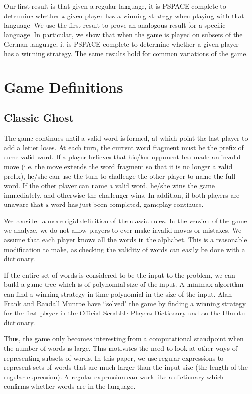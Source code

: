 \documentclass[runningheads,a4paper]{llncs}
\begin{document}
	Our first result is that given a regular language, it is PSPACE-complete to determine whether a given player has a winning strategy when playing with that language. We use the first result to prove an analogous result for a specific language. In particular, we show that when the game is played on subsets of the German language, it is PSPACE-complete to determine whether a given player has a winning strategy. The same results hold for common variations of the game.

\section{Game Definitions}
\label{Game Definitions}

\subsection{Classic Ghost}

The game continues until a valid word is formed, at which point the last player to add a letter loses. At each turn, the current word fragment must be the prefix of some valid word. If a player believes that his/her opponent has made an invalid move (i.e. the move extends the word fragment so that it is no longer a valid prefix), he/she can use the turn to challenge the other player to name the full word. If the other player can name a valid word, he/she wins the game immediately, and otherwise the challenger wins. In addition, if both players are unaware that a word has just been completed, gameplay continues.

	We consider a more rigid definition of the classic rules. In the version of the game we analyze, we do not allow players to ever make invalid moves or mistakes. We assume that each player knows all the words in the alphabet. This is a reasonable modification to make, as checking the validity of words can easily be done with a dictionary.

	If the entire set of words is considered to be the input to the problem, we can build a game tree which is of polynomial size of the input. A minimax algorithm can find a winning strategy in time polynomial in the size of the input. Alan Frank and Randall Munroe have ``solved" the game by finding a winning strategy for the first player in the Official Scrabble Players Dictionary and on the Ubuntu dictionary. 

	Thus, the game only becomes interesting from a computational standpoint when the number of words is large. This motivates the need to look at other ways of representing subsets of words. In this paper, we use regular expressions to represent sets of words that are much larger than the input size (the length of the regular expression). A regular expression can work like a dictionary which confirms whether words are in the language.
\end{document}
